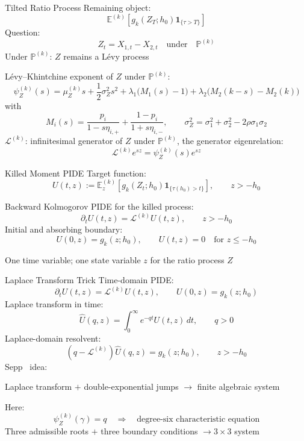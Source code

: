 \documentclass[aspectratio=169,10pt]{beamer}
\newcommand{\E}{\mathbb{E}}
\newcommand{\Pbb}{\mathbb{P}}
\newcommand{\one}{\mathbf{1}}
\begin{document}
\begin{frame}{Tilted Ratio Process}
  \small
  Remaining object:
  \[
    \E^{(k)}\!\left[
      g_k(Z_T;h_0)\one_{\{\tau>T\}}
    \right]
  \]
  Question:
  \[
    Z_t=X_{1,t}-X_{2,t}
    \quad\text{under}\quad \Pbb^{(k)}
  \]
  Under $\Pbb^{(k)}$: $Z$ remains a L\'evy process

  L\'evy--Khintchine exponent of $Z$ under $\Pbb^{(k)}$:
  \[
    \psi_Z^{(k)}(s)
    =
    \mu_Z^{(k)}s+\frac12\sigma_Z^2s^2
    +\lambda_1\big(M_1(s)-1\big)
    +\lambda_2\big(M_2(k-s)-M_2(k)\big)
  \]
  with
  \[
    M_i(s)=
    \frac{p_i}{1-s\eta_{i,+}}
    +
    \frac{1-p_i}{1+s\eta_{i,-}},
    \qquad
    \sigma_Z^2=\sigma_1^2+\sigma_2^2-2\rho\sigma_1\sigma_2
  \]
  $\mathcal L^{(k)}$: infinitesimal generator of $Z$ under $\Pbb^{(k)}$, the generator eigenrelation:
  \[
    \mathcal L^{(k)}e^{sz}=\psi_Z^{(k)}(s)e^{sz}
  \]
\end{frame}

\begin{frame}{Killed Moment PIDE}
  \small
  Target function:
  \[
    U(t,z)
    :=
    \E_z^{(k)}\!\left[
      g_k(Z_t;h_0)\one_{\{\tau(h_0)>t\}}
    \right],
    \qquad z>-h_0
  \]
  \vspace{0.2em}

  Backward Kolmogorov PIDE for the killed process:
  \[
    \partial_t U(t,z)=\mathcal L^{(k)}U(t,z),
    \qquad z>-h_0
  \]
  Initial and absorbing boundary:
  \[
    U(0,z)=g_k(z;h_0),
    \qquad
    U(t,z)=0\quad\text{for }z\le -h_0
  \]
  \vspace{0.2em}
  
  One time variable; one state variable $z$ for the ratio process $Z$

\end{frame}

\begin{frame}{Laplace Transform Trick}
  \small
  Time-domain PIDE:
  \[
    \partial_t U(t,z)=\mathcal L^{(k)}U(t,z),
    \qquad
    U(0,z)=g_k(z;h_0)
  \]
  Laplace transform in time:
  \[
    \widehat U(q,z)=\int_0^\infty e^{-qt}U(t,z)\,dt,
    \qquad q>0
  \]
  Laplace-domain resolvent:
  \[
    (q-\mathcal L^{(k)})\widehat U(q,z)=g_k(z;h_0),
    \qquad z>-h_0
  \]
  Sepp~\cite{Sepp2004} idea:

  Laplace transform $+$ double-exponential jumps $\rightarrow$ finite algebraic system
  \vspace{0.25em}

  Here:
  \[
    \psi_Z^{(k)}(\gamma)=q
    \quad\Longrightarrow\quad
    \text{degree-six characteristic equation}
  \]
  Three admissible roots $+$ three boundary conditions $\rightarrow 3\times3$ system
\end{frame}
\end{document}
